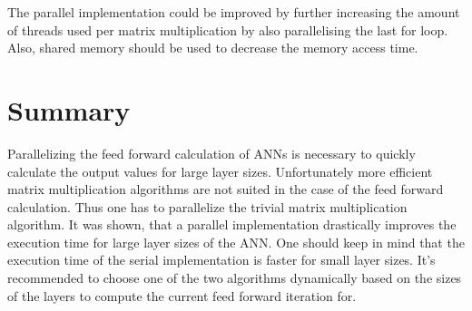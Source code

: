 \documentclass[sigconf]{acmart}
\begin{document}
The parallel implementation could be improved by further increasing the amount of threads used per matrix multiplication by also parallelising the last for loop.
Also, shared memory should be used to decrease the memory access time.


\section{Summary}
Parallelizing the feed forward calculation of ANNs is necessary to quickly calculate the output values for large layer sizes.
Unfortunately more efficient matrix multiplication algorithms are not suited in the case of the feed forward calculation. Thus one has to parallelize the trivial
matrix multiplication algorithm.
It was shown, that a parallel implementation drastically improves the execution time for large layer sizes of the ANN.
One should keep in mind that the execution time of the serial implementation is faster for small layer sizes. It's recommended to choose one of the two algorithms dynamically
based on the sizes of the layers to compute the current feed forward iteration for.
\end{document}
